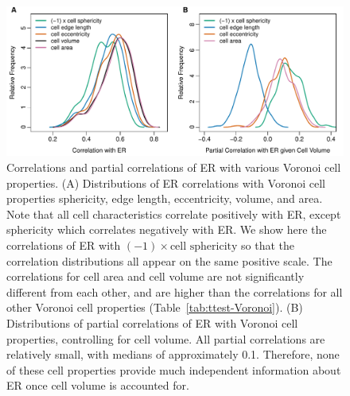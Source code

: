 \documentclass[12pt]{article}
\begin{document}
    \begin{figure}
        \begin{center}
            \includegraphics[width=6.5in]{best_voronoi_predictors_of_ER_screen_V.pdf}
        \end{center}
        \caption{Correlations and partial correlations of ER with various Voronoi cell properties. (A) Distributions of ER correlations with Voronoi cell properties sphericity, edge length, eccentricity, volume, and area. Note that all cell characteristics correlate positively with ER, except sphericity which correlates negatively with ER. We show here the correlations of ER with $(-1)\times \text{cell sphericity}$ so that the correlation distributions all appear on the same positive scale. The correlations for cell area and cell volume are not significantly different from each other, and are higher than the correlations for all other Voronoi cell properties (Table~\ref{tab:ttest-Voronoi}). (B) Distributions of partial correlations of ER with Voronoi cell properties, controlling for cell volume. All partial correlations are relatively small, with medians of approximately 0.1. Therefore, none of these cell properties provide much independent information about ER once cell volume is accounted for.}
        \label{fig:voronoi_ER_screen}
    \end{figure}
\end{document}
